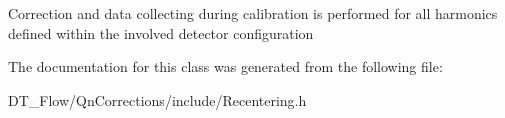 Correction and data collecting during calibration is performed for all harmonics defined within the involved detector configuration 

The documentation for this class was generated from the following file\+:\begin{DoxyCompactItemize}
\item 
D\+T\+\_\+\+Flow/\+Qn\+Corrections/include/Recentering.\+h\end{DoxyCompactItemize}
